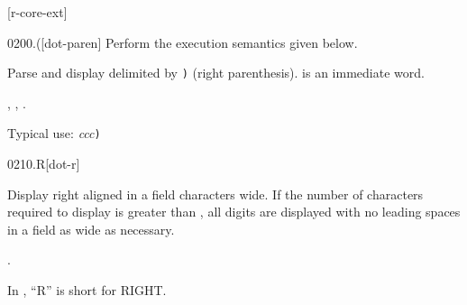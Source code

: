 
\ifanswerfiles

	[r-core-ext]
\fi

%
%
%


\begin{worddef}[.p]{0200}{.(}[dot-paren]
\compile
	Perform the execution semantics given below.

\execute

	Parse and display  delimited by \texttt{)} (right
	parenthesis).  is an immediate word.

\see {},
	,
	.

	\begin{rationale} %
		Typical use:
			 \emph{ccc}\texttt{)}
	\end{rationale}
\end{worddef}


\begin{worddef}{0210}{.R}[dot-r]
\item {}

	Display  right aligned in a field 
	characters wide. If the number of characters required to display
	 is greater than , all digits are displayed
	with no leading spaces in a field as wide as necessary.

\see {}.

	\begin{rationale} %
		In , ``R'' is short for RIGHT.
	\end{rationale}
\end{worddef}


